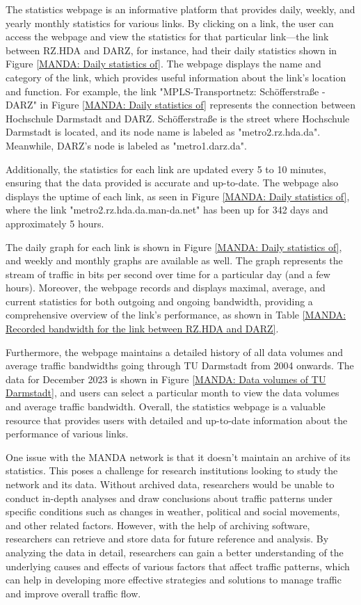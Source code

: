 \documentclass[sigconf,authorversion,nonacm]{acmart}
\begin{document}
The statistics webpage is an informative platform that provides daily, weekly, and yearly monthly statistics for various links. By clicking on a link, the user can access the webpage and view the statistics for that particular link—the link between RZ.HDA and DARZ, for instance, had their daily statistics shown in Figure \ref{MANDA: Daily statistics of}. The webpage displays the name and category of the link, which provides useful information about the link's location and function. For example, the link "MPLS-Transportnetz: Schöfferstraße - DARZ" in Figure \ref{MANDA: Daily statistics of} represents the connection between Hochschule Darmstadt and DARZ. Schöfferstraße is the street where Hochschule Darmstadt is located, and its node name is labeled as "metro2.rz.hda.da". Meanwhile, DARZ's node is labeled as "metro1.darz.da". 

Additionally, the statistics for each link are updated every 5 to 10 minutes, ensuring that the data provided is accurate and up-to-date. The webpage also displays the uptime of each link, as seen in Figure \ref{MANDA: Daily statistics of}, where the link "metro2.rz.hda.da.man-da.net" has been up for 342 days and approximately 5 hours. 

The daily graph for each link is shown in Figure \ref{MANDA: Daily statistics of}, and weekly and monthly graphs are available as well. The graph represents the stream of traffic in bits per second over time for a particular day (and a few hours). Moreover, the webpage records and displays maximal, average, and current statistics for both outgoing and ongoing bandwidth, providing a comprehensive overview of the link's performance, as shown in Table \ref{MANDA: Recorded bandwidth for the link between RZ.HDA and DARZ}. 

Furthermore, the webpage maintains a detailed history of all data volumes and average traffic bandwidths going through TU Darmstadt from 2004 onwards. The data for December 2023 is shown in Figure \ref{MANDA: Data volumes of TU Darmstadt}, and users can select a particular month to view the data volumes and average traffic bandwidth. Overall, the statistics webpage is a valuable resource that provides users with detailed and up-to-date information about the performance of various links.

One issue with the MANDA network is that it doesn't maintain an archive of its statistics. This poses a challenge for research institutions looking to study the network and its data. Without archived data, researchers would be unable to conduct in-depth analyses and draw conclusions about traffic patterns under specific conditions such as changes in weather, political and social movements, and other related factors. However, with the help of archiving software, researchers can retrieve and store data for future reference and analysis. By analyzing the data in detail, researchers can gain a better understanding of the underlying causes and effects of various factors that affect traffic patterns, which can help in developing more effective strategies and solutions to manage traffic and improve overall traffic flow.
\end{document}
